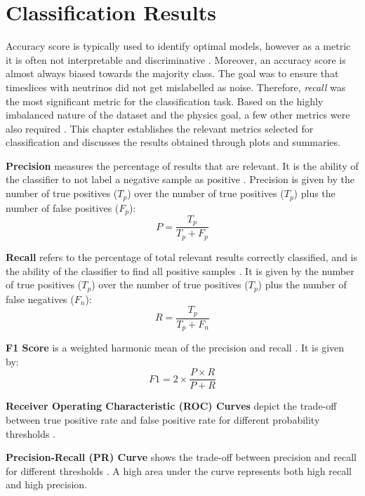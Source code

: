 \chapter{Classification Results}
\label{sec:results}

\ifpdf
    \graphicspath{{7_results/figures/PNG/}{7_results/figures/PDF/}{7_results/figures/}}
\else
    \graphicspath{{7_results/figures/EPS/}{7_results/figures/}}
\fi

Accuracy score is typically used to identify optimal models, however as a metric it is often not interpretable and discriminative \cite{hossin2015review}. Moreover, an accuracy score is almost always biased towards the majority class. The goal was to ensure that timeslices with neutrinos did not get mislabelled as noise. Therefore, \textit{recall} was the most significant metric for the classification task.
Based on the highly imbalanced nature of the dataset and the physics goal, a few other metrics were also required \cite{scikit-learn}. This chapter establishes the relevant metrics selected for classification and discusses the results obtained through plots and summaries. 

\textbf{Precision} measures the percentage of results that are relevant. It is the ability of the classifier to not label a negative sample as positive \cite{scikit-learn}. Precision is given by the number of true positives (${T}_p$) over the number of true positives (${T}_p$) plus the number of false positives (${F}_p$):
    \[
        P = \frac{{T}_p}{{T}_p + {F}_p}
    \]
    
\textbf{Recall} refers to the percentage of total relevant results correctly classified, and is the ability of the classifier to find all positive samples \cite{scikit-learn}. It is given by the number of true positives (${T}_p$) over the number of true positives (${T}_p$)  plus the number of false negatives (${F}_n$):
    \[
        R = \frac{{T}_p}{{T}_p + {F}_n}
    \]

\textbf{F1 Score} is a weighted harmonic mean of the precision and recall \cite{scikit-learn}. It is given by:
    \[
        F1 = 2 \times \frac{P \times R}{P + R}
    \]

\textbf{Receiver Operating Characteristic (ROC) Curves} depict the trade-off between true positive rate and false positive rate for different probability thresholds \cite{scikit-learn}.
 
\textbf{Precision-Recall (PR) Curve} shows the trade-off between precision and recall for different thresholds \cite{scikit-learn}. A high area under the curve represents both high recall and high precision. 

